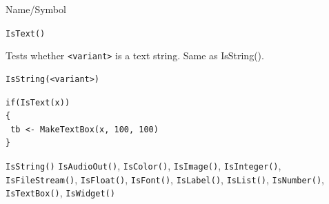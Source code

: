 \begin{desc}{Name/Symbol}
\item[Name/Symbol]	\verb+IsText()+

\item[Description]	Tests whether \verb+<variant>+ is a text string.
  Same as IsString().

\item[Usage]		
\begin{verbatim}
IsString(<variant>)
\end{verbatim}

\item[Example]	
\begin{verbatim}
if(IsText(x))
{
 tb <- MakeTextBox(x, 100, 100)
}
\end{verbatim}

\item[See Also] \verb+IsString()+	\verb+IsAudioOut()+, \verb+IsColor()+, \verb+IsImage()+, \verb+IsInteger()+, 
		\verb+IsFileStream()+, \verb+IsFloat()+, \verb+IsFont()+, \verb+IsLabel()+,
		\verb+IsList()+, \verb+IsNumber()+, \verb+IsTextBox()+, \verb+IsWidget()+
\end{desc}


